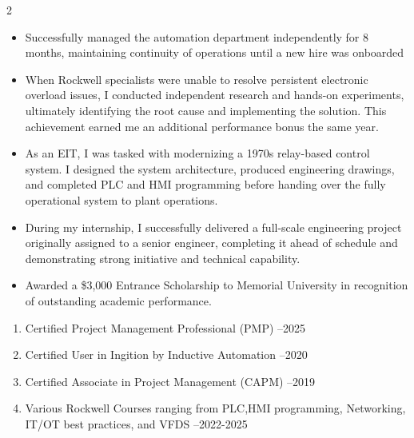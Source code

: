 \documentclass[10pt,a4paper,ragged2e,withhyper]{altacv}
\begin{document}
\begin{paracol}{2}

\divider

\begin{itemize}
\item {Successfully managed the automation department independently for 8 months, maintaining continuity of operations until a new hire was onboarded}
\item {When Rockwell specialists were unable to resolve persistent electronic overload issues, I conducted independent research and hands-on experiments, ultimately identifying the root cause and implementing the solution. This achievement earned me an additional performance bonus the same year.}
\item {As an EIT, I was tasked with modernizing a 1970s relay-based control system. I designed the system architecture, produced engineering drawings, and completed PLC and HMI programming before handing over the fully operational system to plant operations.}
\item {During my internship, I successfully delivered a full-scale engineering project originally assigned to a senior engineer, completing it ahead of schedule and demonstrating strong initiative and technical capability.}
\item {Awarded a \$3,000 Entrance Scholarship to Memorial University in recognition of outstanding academic performance.}

\end{itemize}
\divider
{}



\begin{enumerate}
\item  Certified Project Management Professional (PMP) --2025
\item  Certified User in Ingition by Inductive Automation --2020
\item  Certified Associate in Project Management (CAPM) --2019
\item  Various Rockwell Courses ranging from PLC,HMI programming, Networking, IT/OT best practices, and VFDS --2022-2025




\end{enumerate}
\end{paracol}
\end{document}
